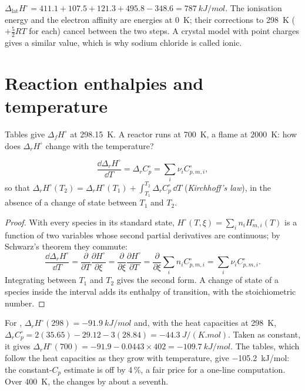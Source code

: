 \begin{example}\label{ex:b2:reaction-enthalpy:nacl}
$\Delta_{\text{lat}}H^\circ = 411.1 + 107.5 + 121.3 + 495.8 - 348.6 =
\qty{787}{kJ/mol}$. The ionisation energy and the electron affinity are
energies at \qty{0}{K}; their corrections to \qty{298}{K} ($+\tfrac52RT$
for each) cancel between the two steps. A crystal model with point charges
gives a similar value, which is why sodium chloride is called ionic.
\end{example}

\section{Reaction enthalpies and temperature}

Tables give $\Delta_f H^\circ$ at \qty{298.15}{K}. A reactor runs at
\qty{700}{K}, a flame at \qty{2000}{K}: how does $\Delta_r H^\circ$ change
with the temperature?

\begin{theorem}\label{thm:b2:reaction-enthalpy:kirchhoff}
\[
  \frac{\dd\Delta_r H^\circ}{\dd T} = \Delta_r C_p^\circ =
  \sum_i\nu_i C_{p,m,i}^\circ ,
\]
so that $\Delta_r H^\circ(T_2) = \Delta_r H^\circ(T_1) + \int_{T_1}^{T_2}
\Delta_r C_p^\circ\,\dd T$ (\emph{Kirchhoff's law}),
in the absence of a change of state between $T_1$ and $T_2$.
\end{theorem}

\begin{proof}
With every species in its standard state, $H^\circ(T, \xi) = \sum_in_i
H^\circ_{m,i}(T)$ is a function of two variables whose second partial
derivatives are continuous; by Schwarz's theorem they commute:
\[
  \frac{\dd\Delta_r H^\circ}{\dd T} = \frac{\partial}{\partial T}
  \frac{\partial H^\circ}{\partial\xi} = \frac{\partial}{\partial\xi}
  \frac{\partial H^\circ}{\partial T} = \frac{\partial}{\partial\xi}
  \sum_in_iC^\circ_{p,m,i} = \sum_i\nu_iC^\circ_{p,m,i}.
\]
Integrating between $T_1$ and $T_2$ gives the second form. A change of
state of a species inside the interval adds its enthalpy of transition,
with the stoichiometric number.
\end{proof}

\begin{example}\label{ex:b2:reaction-enthalpy:kirchhoff}
For , $\Delta_r H^\circ(298) =
\qty{-91.9}{kJ/mol}$ and, with the heat capacities at \qty{298}{K},
$\Delta_r C_p^\circ = 2(35.65) - 29.12 - 3(28.84) =
\qty{-44.3}{J/(K.mol)}$. Taken as constant, it gives $\Delta_r
H^\circ(700) = -91.9 - 0.0443 \times 402 = \qty{-109.7}{kJ/mol}$. The tables,
which follow the heat capacities as they grow with temperature, give
\qty{-105.2}{kJ/mol}: the constant-$C_p$ estimate is off by 4\,\%, a
fair price for a one-line computation. Over \qty{400}{K}, the  changes by about a seventh.
\end{example}

